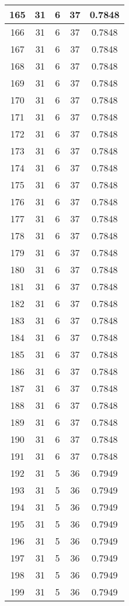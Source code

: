 \documentclass[letterpaper, 12pt]{article}
\begin{document}
\begin{longtable}{|c|c|c|c|c|}
\hline
165 & 31 & 6 & 37 & 0.7848 \\
\hline
166 & 31 & 6 & 37 & 0.7848 \\
\hline
167 & 31 & 6 & 37 & 0.7848 \\
\hline
168 & 31 & 6 & 37 & 0.7848 \\
\hline
169 & 31 & 6 & 37 & 0.7848 \\
\hline
170 & 31 & 6 & 37 & 0.7848 \\
\hline
171 & 31 & 6 & 37 & 0.7848 \\
\hline
172 & 31 & 6 & 37 & 0.7848 \\
\hline
173 & 31 & 6 & 37 & 0.7848 \\
\hline
174 & 31 & 6 & 37 & 0.7848 \\
\hline
175 & 31 & 6 & 37 & 0.7848 \\
\hline
176 & 31 & 6 & 37 & 0.7848 \\
\hline
177 & 31 & 6 & 37 & 0.7848 \\
\hline
178 & 31 & 6 & 37 & 0.7848 \\
\hline
179 & 31 & 6 & 37 & 0.7848 \\
\hline
180 & 31 & 6 & 37 & 0.7848 \\
\hline
181 & 31 & 6 & 37 & 0.7848 \\
\hline
182 & 31 & 6 & 37 & 0.7848 \\
\hline
183 & 31 & 6 & 37 & 0.7848 \\
\hline
184 & 31 & 6 & 37 & 0.7848 \\
\hline
185 & 31 & 6 & 37 & 0.7848 \\
\hline
186 & 31 & 6 & 37 & 0.7848 \\
\hline
187 & 31 & 6 & 37 & 0.7848 \\
\hline
188 & 31 & 6 & 37 & 0.7848 \\
\hline
189 & 31 & 6 & 37 & 0.7848 \\
\hline
190 & 31 & 6 & 37 & 0.7848 \\
\hline
191 & 31 & 6 & 37 & 0.7848 \\
\hline
192 & 31 & 5 & 36 & 0.7949 \\
\hline
193 & 31 & 5 & 36 & 0.7949 \\
\hline
194 & 31 & 5 & 36 & 0.7949 \\
\hline
195 & 31 & 5 & 36 & 0.7949 \\
\hline
196 & 31 & 5 & 36 & 0.7949 \\
\hline
197 & 31 & 5 & 36 & 0.7949 \\
\hline
198 & 31 & 5 & 36 & 0.7949 \\
\hline
199 & 31 & 5 & 36 & 0.7949 \\
\hline
\end{longtable}
\end{document}
